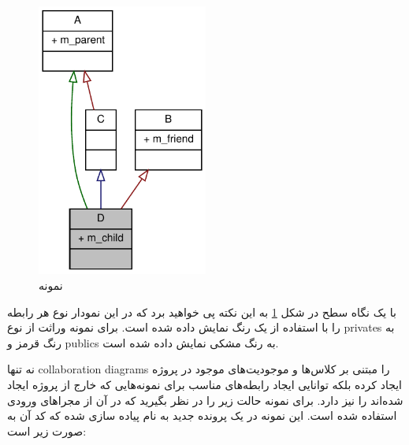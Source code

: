 \begin{figure}
	\centering
	\includegraphics[width=0.5\textwidth]{image/write/graph/example/class_d__inherit__graph}
	\caption[نمونه]{
		نمونه
	}
	\label{image/write/graph/example/class_d__inherit__graph}
\end{figure}

با یک نگاه سطح در شکل \ref{image/write/graph/example/class_d__inherit__graph} به
این نکته پی خواهید برد که در این نمودار نوع هر رابطه را با استفاده از یک رنگ
نمایش داده شده است. برای نمونه وراثت از نوع \glspl{private} به رنگ قرمز و
\glspl{public} به رنگ مشکی نمایش داده شده است.

 نه تنها \glspl{collaboration diagram} را مبتنی بر کلاس‌ها و
موجودیت‌های موجود در پروژه ایجاد کرده بلکه توانایی ایجاد رابطه‌های مناسب برای
نمونه‌هایی که خارج از پروژه ایجاد شده‌اند را نیز دارد. برای نمونه حالت زیر را در
نظر بگیرید که در آن از مجراهای ورودی استفاده شده است. این نمونه در یک پرونده
جدید به نام  پیاده سازی شده که کد آن به صورت زیر است:


